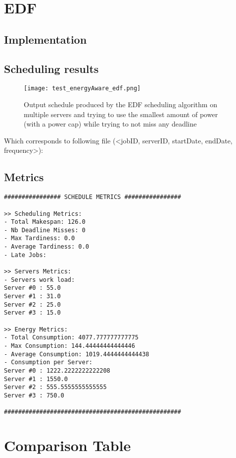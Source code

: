 \documentclass[./report.tex]{subfiles}
\begin{document}
\newpage
\section{EDF}
\subsection{Implementation}

\subsection{Scheduling results}
\begin{figure}[!h]
	\center
	\texttt{[image: test\_energyAware\_edf.png]}
	\caption{Output schedule produced by the EDF scheduling algorithm on multiple servers and trying to use the smallest amount of power (with a power cap) while trying to not miss any deadline}
	\label{fig:energyAware_fifo} 
\end{figure}

Which corresponds to following file (<jobID, serverID, startDate, endDate, frequency>):


\newpage
\subsection{Metrics}
\begin{lstlisting}[style=txt, caption={Metrics for EDF on multiple energy aware servers}]
################ SCHEDULE METRICS ################

>> Scheduling Metrics: 
- Total Makespan: 126.0
- Nb Deadline Misses: 0
- Max Tardiness: 0.0
- Average Tardiness: 0.0
- Late Jobs: 

>> Servers Metrics: 
- Servers work load:
Server #0 : 55.0
Server #1 : 31.0
Server #2 : 25.0
Server #3 : 15.0

>> Energy Metrics: 
- Total Consumption: 4077.777777777775
- Max Consumption: 144.44444444444446
- Average Consumption: 1019.4444444444438
- Consumption per Server: 
Server #0 : 1222.2222222222208
Server #1 : 1550.0
Server #2 : 555.5555555555555
Server #3 : 750.0

##################################################
\end{lstlisting}


\newpage
\section{Comparison Table}
\end{document}
